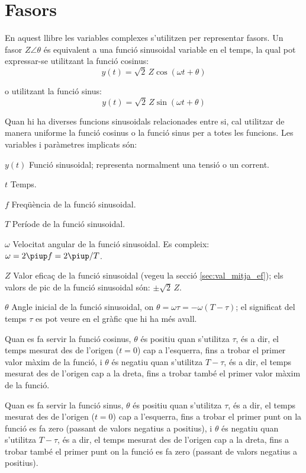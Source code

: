 \section*{Fasors} 

En aquest llibre les variables complexes s'utilitzen per representar fasors. Un fasor $Z\angle\theta$ és equivalent a una funció sinusoidal variable en el temps, la qual pot expressar-se utilitzant la funció cosinus:
\[y(t)=\sqrt{2}\, Z \cos(\omega t + \theta)\]

o utilitzant la funció sinus:
\[y(t)=\sqrt{2}\, Z \sin(\omega t + \theta)\]

Quan hi ha diverses funcions sinusoidals relacionades entre si, cal utilitzar de manera uniforme la funció cosinus o la funció sinus per a totes les funcions. Les variables i paràmetres implicats són:
\begin{list}{}
{\setlength{\labelwidth}{15mm} \setlength{\leftmargin}{20mm}
\setlength{\labelsep}{5mm}}
    \item[$y(t)$] Funció sinusoidal; representa normalment una tensió o un corrent.
    \item[$t$] Temps.
    \item[$f$] Freqüència de la funció sinusoidal.
    \item[$T$] Període de la funció sinusoidal.
    \item[$\omega$] Velocitat angular de la funció sinusoidal. Es compleix: $\omega = 2 \piup f = 2 \piup/T$.
    \item[$Z$] Valor eficaç de la funció sinusoidal (vegeu la secció \vref{sec:val_mitja_ef}); els valors de pic de la funció sinusoidal  són:  $\pm\sqrt{2}\, Z$.
    \item[$\theta$] Angle inicial de la funció sinusoidal, on  $\theta=\omega \tau = -\omega (T-\tau)$; el significat del temps $\tau$  es pot veure en el gràfic que hi ha més avall.

    Quan es fa servir la funció cosinus, $\theta$ és positiu quan s'utilitza $\tau$, és a dir, el temps mesurat  des de l'origen ($t=0$) cap a l'esquerra, fins a trobar el primer valor màxim de la funció, i $\theta$ és negatiu quan s'utilitza $T-\tau$, és a dir, el temps mesurat des de l'origen cap a la dreta, fins a trobar també el primer valor màxim de la funció.

    Quan es fa servir la funció sinus, $\theta$ és positiu quan s'utilitza $\tau$, és a dir, el temps mesurat des de l'origen ($t=0$) cap a l'esquerra, fins a trobar el primer punt on la funció es fa zero (passant de valors negatius a positius), i $\theta$ és negatiu quan s'utilitza $T-\tau$, és a dir, el temps mesurat des de l'origen cap a la dreta, fins a trobar també el primer punt on la funció es fa zero (passant de valors negatius a positius).
    \item[] 
\end{list}

